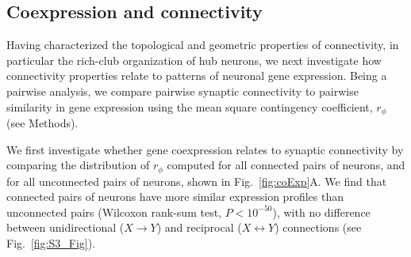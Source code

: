 \documentclass[10pt,letterpaper]{article}
\begin{document}
\subsection*{Coexpression and connectivity}

Having characterized the topological and geometric properties of connectivity, in particular the rich-club organization of hub neurons, we next investigate how connectivity properties relate to patterns of neuronal gene expression.
Being a pairwise analysis, we compare pairwise synaptic connectivity to pairwise similarity in gene expression using the mean square contingency coefficient, $r_\phi$ (see Methods).

We first investigate whether gene coexpression relates to synaptic connectivity by comparing the distribution of $r_\phi$ computed for all connected pairs of neurons, and for all unconnected pairs of neurons, shown in Fig.~\ref{fig:coExp}A.
We find that connected pairs of neurons have more similar expression profiles than unconnected pairs (Wilcoxon rank-sum test, $P < 10^{-50}$), with no difference between unidirectional ($X \rightarrow Y$) and reciprocal ($X \leftrightarrow Y$) connections (see Fig.~\ref{fig:S3_Fig}).
\end{document}
